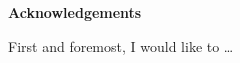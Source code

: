 \begin{center}
    \LARGE
    \textbf{Acknowledgements}
    \vspace{0.5cm}
\end{center}

First and foremost, I would like to \ldots

